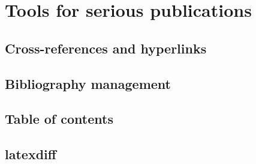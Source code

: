 \chapter{Tools for serious publications}

\section{Cross-references and hyperlinks}\label{sec:crossref}

\section{Bibliography management}\label{sec:bibliography}



\section{Table of contents}


\section{latexdiff}
